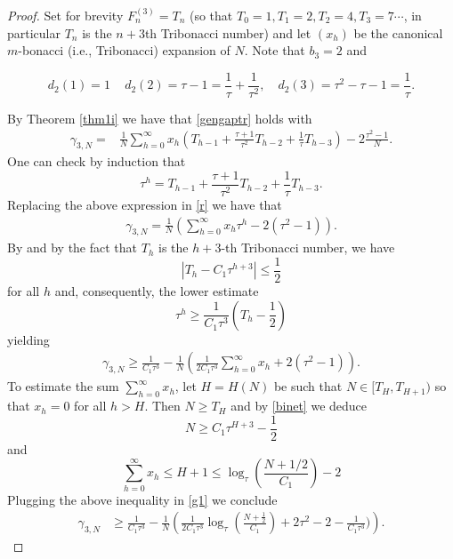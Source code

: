 \documentclass{amsart}
\begin{document}
\begin{proof}
Set for brevity $F^{(3)}_n=T_n$ (so that $T_0=1, T_1=2,T_2=4,T_3=7 \cdots$, in particular $T_n$ is the $n+3$th Tribonacci number) and let $(x_h)$ be the canonical $m$-bonacci (i.e., Tribonacci) expansion of $N$. Note that $b_3=2$ and

$$d_2(1)=1\,\quad d_2(2)= \tau-1=\frac{1}{\tau}+\frac{1}{\tau^2},   \quad d_2(3)=\tau^2-\tau-1=\frac{1}{\tau}.$$

By Theorem \ref{thm1i} we have that \eqref{gengaptr} holds with 
\begin{equation}\label{r}\begin{split}\gamma_{3,N}=&\frac{1}{N}\sum_{h=0}^\infty x_h\left(T_{h-1}+\frac{\tau+1}{\tau^2}T_{h-2}+\frac{1}{\tau}T_{h-3}\right)-2\frac{\tau^2-1}{N}.\end{split}\end{equation}
One can check by induction  that 
\begin{equation}\label{rec} \tau^h= T_{h-1}+\frac{\tau+1}{\tau^2} T_{h-2}+ \frac{1}{\tau}T_{h-3}.\end{equation}
Replacing the above expression in \eqref{r}  we have that 
\begin{align}\gamma_{3,N}=\frac{1}{N}\left( \sum_{h=0}^\infty x_h \tau^h-2(\tau^2-1)\right).\label{g}
\end{align}
By \cite{binet} and by the fact  that $T_h$ is the $h+3$-th Tribonacci number, we have  \begin{equation}\label{binet} |T_{h}-C_1\tau^{h+3}|\leq \frac{1}{2} \end{equation}
for all $h$ and, consequently, the lower estimate
$$\tau^h\geq \frac{1}{C_1\tau^3}\left(T_h-\frac{1}{2}\right)$$
yielding
\begin{align}\gamma_{3,N}\geq\frac{1}{C_1\tau^3}-\frac{1}{N}\left( \frac{1}{2C_1\tau^3}\sum_{h=0}^\infty x_h +2(\tau^2-1)\right).\label{g1}
\end{align}
To estimate the sum $\sum_{h=0}^\infty x_h$, let $H=H(N)$ be such that $N\in[T_H,T_{H+1})$ so that $x_h=0$ for all $h>H$.  
Then $N\geq T_{H}$ and by \eqref{binet} we deduce
$$N\geq C_1\tau^{H+3} - \frac{1}{2}$$
and
$$\sum_{h=0}^\infty x_h\leq H+1 \le \log_\tau\left(\frac{N+1/2}{C_1}\right)-2$$
Plugging the above inequality in \eqref{g1} we conclude
\begin{align*}\gamma_{3,N}&\geq
\frac{1}{C_1\tau^3} -\frac{1}{N}\left( \frac{1}{2C_1\tau^3}\log_\tau \left( \frac{N +\frac{1}{2}}{C_1} \right)+2\tau^2-2-\frac{1}{C_1\tau^3})\right).
\end{align*}


\end{proof}
\end{document}
